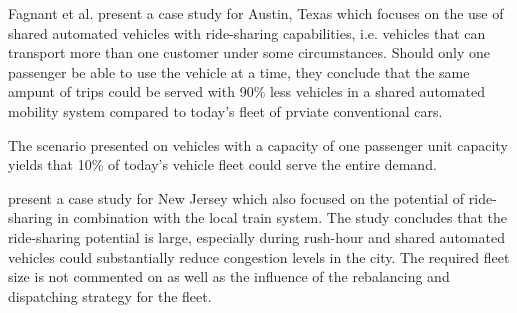 
Fagnant et al. \cite{fagnant2015dynamic} present a case study for Austin, Texas
which focuses on the use of shared automated vehicles with ride-sharing capabilities,
i.e. vehicles that can transport more than one customer under some circumstances. Should only one passenger be able to use the vehicle at a time, they conclude that the same ampunt of trips could be served with 90\% less vehicles in a shared automated mobility system compared to today's fleet of prviate conventional cars.

The scenario presented on vehicles with a capacity of one passenger unit capacity yields that 10\% of today's
vehicle fleet could serve the entire demand. %

\cite{zachariah2014uncongested} present a case study for New Jersey which also focused
on the potential of ride-sharing in combination with the local train system.
The study concludes that the ride-sharing potential
is large, especially during rush-hour and shared automated vehicles could substantially
reduce congestion levels in the city. The required fleet size is not commented on
as well as the influence of the rebalancing and dispatching strategy for the fleet.

